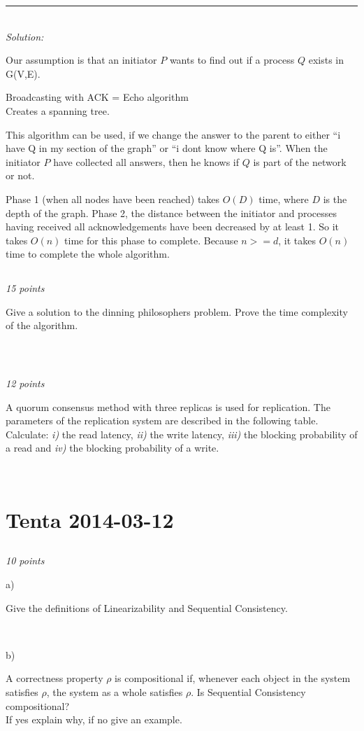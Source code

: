 \documentclass[a4paper]{article}
\newcommand{\horrule}[1]{\rule{\linewidth}{#1}} %
\newcommand{\points}[1]{\subsection{} \textit{#1 points}\\}
\newcommand{\question}[2][]{
  \noindent
  \parbox[t]{\textwidth}{#1 \parbox[t]{0.95\textwidth}{#2}}\\
}
\newcommand{\solution}[1]{\horrule{0.5pt}\\[3pt]\textit{Solution: }\\\begin{minipage}{\textwidth}#1\end{minipage}}
\begin{document}
\solution{
  Our assumption is that an initiator $P$ wants to find out if a
  process $Q$ exists in G(V,E).


  Broadcasting with ACK = Echo algorithm\\
  Creates a spanning tree.

  \usebox{\userinput}

  This algorithm can be used, if we change the answer to the parent to
  either ``i have Q in my section of the graph'' or ``i dont know
  where Q is''.
  When the initiator $P$ have collected all answers, then he knows if
  $Q$ is part of the network or not.

  Phase 1 (when all nodes have been reached) takes $O(D)$ time, where
  $D$ is the depth of the graph.
  Phase 2, the distance between the initiator and processes having
  received all acknowledgements have been decreased by at least 1. So
  it takes $O(n)$ time for this phase to complete.
  Because $ n >= d $, it takes $O(n)$ time to complete the whole
  algorithm.
}

\points{15}
\question{
  Give a solution to the dinning philosophers problem. Prove the time
  complexity of the algorithm.
}

\points{12}
\question{
  A quorum consensus method with three replicas is used for
  replication. The parameters of the replication system are described in
  the following table. Calculate: \textit{i)} the read latency,
  \textit{ii)} the write latency, \textit{iii)} the blocking probability
  of a read and \textit{iv)} the blocking probability of a write.
}

\section{Tenta 2014-03-12}
\points{10}
\label{2014-03:linearizability}
\question[a)]{
  Give the definitions of Linearizability and Sequential Consistency.
}
\question[b)]{
  A correctness property $\rho$ is compositional if, whenever
  each object in the system satisfies $\rho$, the system as a whole
  satisfies $\rho$. Is Sequential Consistency compositional? \\
  If yes explain why, if no give an example.
}
\end{document}

